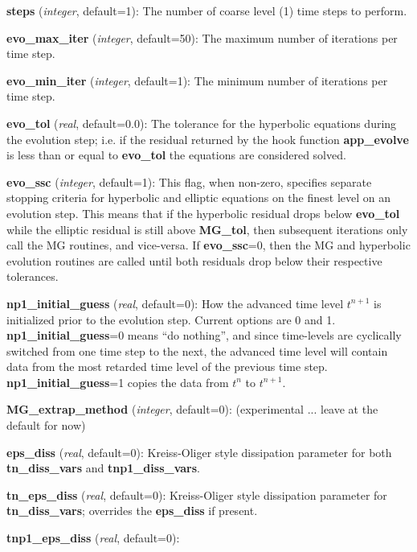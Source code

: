 \documentclass[aps,amssymb,unsortedaddress,nofootinbib]{revtex4}
\def\lsep{\itemsep 0.05in}
\begin{document}
\begin{list}{}{\lsep}
\item {\bf steps} ({\em integer}, default=1): 
      The number of coarse level (1) time steps to perform.
\item {\bf evo\_max\_iter} ({\em integer}, default=50): 
      The maximum number of iterations per time step.
\item {\bf evo\_min\_iter} ({\em integer}, default=1):
      The minimum number of iterations per time step.
\item {\bf evo\_tol} ({\em real}, default=0.0):
      The tolerance for the hyperbolic equations during the evolution step; i.e. if the
      residual returned by the hook function {\bf app\_evolve} is less
      than or equal to {\bf evo\_tol} the equations are considered solved.
\item {\bf evo\_ssc} ({\em integer}, default=1):
      This flag, when non-zero, specifies separate stopping criteria for
      hyperbolic and elliptic equations on the finest level on an evolution step. 
      This means that if the hyperbolic residual drops below {\bf evo\_tol}
      while the elliptic residual is still above {\bf MG\_tol}, then subsequent
      iterations only call the MG routines, and vice-versa. If {\bf evo\_ssc}=0,
      then the MG and hyperbolic evolution routines are called until 
      both residuals drop below their respective tolerances.
\item {\bf np1\_initial\_guess} ({\em real}, default=0):
      How the advanced time level $t^{n+1}$ is initialized prior to the evolution step.
      Current options are 0 and 1.
      {\bf np1\_initial\_guess}=0 means ``do nothing'', and since time-levels are 
      cyclically switched from one time step to the next, the advanced time 
      level will contain data from the most retarded time level of the previous
      time step. {\bf np1\_initial\_guess}=1 copies the data from $t^n$ to $t^{n+1}$.
\item {\bf MG\_extrap\_method} ({\em integer}, default=0):
      (experimental ... leave at the default for now)
\item {\bf eps\_diss} ({\em real}, default=0):
      Kreiss-Oliger style dissipation parameter for both {\bf tn\_diss\_vars} and
      {\bf tnp1\_diss\_vars}.
\item {\bf tn\_eps\_diss} ({\em real}, default=0):
      Kreiss-Oliger style dissipation parameter for {\bf tn\_diss\_vars}; overrides
      the {\bf eps\_diss} if present.
\item {\bf tnp1\_eps\_diss} ({\em real}, default=0):

\end{list}
\end{document}
